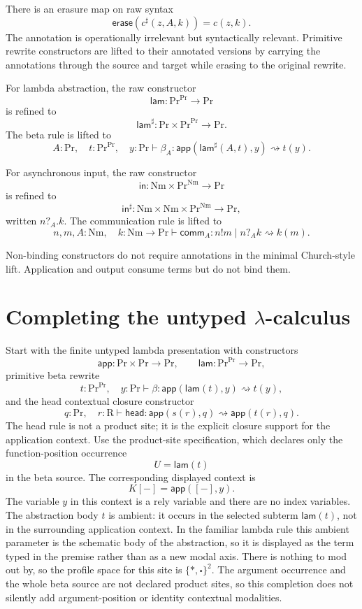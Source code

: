 \documentclass[11pt]{article}
\newcommand{\Proc}{\mathrm{Pr}}
\newcommand{\Rew}{\mathrm{R}}
\newcommand{\Nm}{\mathrm{Nm}}
\newcommand{\rw}{\rightsquigarrow}
\newcommand{\app}{\mathsf{app}}
\newcommand{\lam}{\mathsf{lam}}
\newcommand{\Lam}{\mathsf{lam}^{\sharp}}
\newcommand{\inp}{\mathsf{in}}
\newcommand{\Inp}{\mathsf{in}^{\sharp}}
\newcommand{\comm}{\mathsf{comm}}
\newcommand{\erase}{\mathsf{erase}}
\newcommand{\hole}{[-]}
\begin{document}
There is an erasure map on raw syntax
\[
  \erase(c^{\sharp}(z,A,k))=c(z,k).
\]
The annotation is operationally irrelevant but syntactically relevant. Primitive rewrite constructors are lifted to their annotated versions by carrying the annotations through the source and target while erasing to the original rewrite.

For lambda abstraction, the raw constructor
\[
  \lam:\Proc^{\Proc}\to\Proc
\]
is refined to
\[
  \Lam:\Proc\times\Proc^{\Proc}\to\Proc.
\]
The beta rule is lifted to
\[
  A:\Proc,
  \quad
  t:\Proc^{\Proc},
  \quad
  y:\Proc
  \vdash
  \beta_A:\app(\Lam(A,t),y)\rw t(y).
\]

For asynchronous input, the raw constructor
\[
  \inp:\Nm\times\Proc^{\Nm}\to\Proc
\]
is refined to
\[
  \Inp:\Nm\times\Nm\times\Proc^{\Nm}\to\Proc,
\]
written \(n?_A.k\). The communication rule is lifted to
\[
  n,m,A:\Nm,
  \quad
  k:\Nm\to\Proc
  \vdash
  \comm_A:n!m\mid n?_A k\rw k(m).
\]

Non-binding constructors do not require annotations in the minimal Church-style lift. Application and output consume terms but do not bind them.


\section{Completing the untyped \texorpdfstring{$\lambda$}{λ}-calculus}

Start with the finite untyped lambda presentation with constructors
\[
  \app:\Proc\times\Proc\to\Proc,
  \qquad
  \lam:\Proc^{\Proc}\to\Proc,
\]
primitive beta rewrite
\[
  t:\Proc^{\Proc},
  \quad
  y:\Proc
  \vdash
  \beta:\app(\lam(t),y)\rw t(y),
\]
and the head contextual closure constructor
\[
  q:\Proc,
  \quad
  r:\Rew
  \vdash
  \mathsf{head}:\app(s(r),q)\rw\app(t(r),q).
\]
The head rule is not a product site; it is the explicit closure support for the
application context.  Use the product-site specification, which declares only
the function-position occurrence
\[
  U=\lam(t)
\]
in the beta source. The corresponding displayed context is
\[
  K[-]=\app(\hole,y).
\]
The variable \(y\) in this context
is a rely variable and there are no index variables.  The abstraction body \(t\)
is ambient: it occurs in the selected subterm \(\lam(t)\), not in the surrounding
application context.  In the familiar lambda rule this ambient parameter is the
schematic body of the abstraction, so it is displayed as the term typed in the
premise rather than as a new modal axis.  There is nothing to mod out by, so the
profile space for this site is \(\{\ast,\square\}^{2}\).  The argument occurrence
and the whole beta source are not declared product sites, so this completion
does not silently add argument-position or identity contextual modalities.
\end{document}
